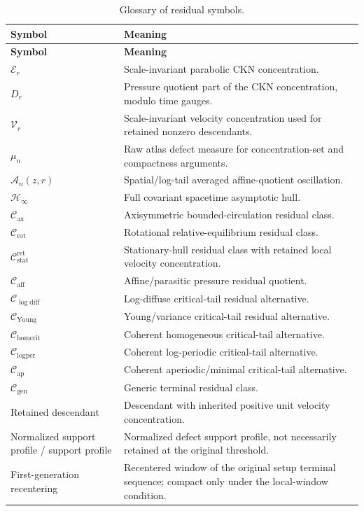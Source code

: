 \documentclass[11pt]{amsart}
\numberwithin{equation}{section}
\theoremstyle{plain}
\theoremstyle{definition}
\theoremstyle{remark}
\newcommand{\calE}{\mathcal E}
\newcommand{\Vel}{\mathcal V}
\newcommand{\calH}{\mathcal H}
\newcommand{\Cax}{\mathcal C_{\mathrm{ax}}}
\newcommand{\Crot}{\mathcal C_{\mathrm{rot}}}
\newcommand{\Cstat}{\mathcal C_{\mathrm{stat}}^{\mathrm{ret}}}
\newcommand{\Caff}{\mathcal C_{\mathrm{aff}}}
\newcommand{\Cgen}{\mathcal C_{\mathrm{gen}}}
\newcommand{\Chomcrit}{\mathcal C_{\mathrm{homcrit}}}
\newcommand{\Clogper}{\mathcal C_{\mathrm{logper}}}
\newcommand{\Capcrit}{\mathcal C_{\mathrm{ap}}}
\newcommand{\Cyoung}{\mathcal C_{\mathrm{Young}}}
\newcommand{\Clogdiff}{\mathcal C_{\log\mathrm{diff}}}
\begin{document}
\begin{longtable}{@{}L{0.28\textwidth}L{0.66\textwidth}@{}}
\caption{Glossary of residual symbols.}
\label{tab:paperIV-glossary}\\
\hline
\textbf{Symbol} & \textbf{Meaning}\\
\hline
\endfirsthead
\hline
\textbf{Symbol} & \textbf{Meaning}\\
\hline
\endhead
\hline
\endfoot
\(\calE_r\) & Scale-invariant parabolic CKN concentration.\\
\(D_r\) & Pressure quotient part of the CKN concentration, modulo time gauges.\\
\(\Vel_r\) & Scale-invariant velocity concentration used for retained
nonzero descendants.\\
\(\mu_n\) & Raw atlas defect measure for concentration-set and compactness
arguments.\\
\(\mathcal A_n(z,r)\) & Spatial/log-tail averaged affine-quotient oscillation.\\
\(\calH_\infty\) & Full covariant spacetime asymptotic hull.\\
\(\Cax\) & Axisymmetric bounded-circulation residual class.\\
\(\Crot\) & Rotational relative-equilibrium residual class.\\
\(\Cstat\) & Stationary-hull residual class with retained local velocity concentration.\\
\(\Caff\) & Affine/parasitic pressure residual quotient.\\
\(\Clogdiff\) & Log-diffuse critical-tail residual alternative.\\
\(\Cyoung\) & Young/variance critical-tail residual alternative.\\
\(\Chomcrit\) & Coherent homogeneous critical-tail alternative.\\
\(\Clogper\) & Coherent log-periodic critical-tail alternative.\\
\(\Capcrit\) & Coherent aperiodic/minimal critical-tail alternative.\\
\(\Cgen\) & Generic terminal residual class.\\
Retained descendant & Descendant with inherited positive unit velocity concentration.\\
Normalized support profile / support profile & Normalized defect
support profile, not necessarily retained at the original threshold.\\
First-generation recentering & Recentered window of the original setup terminal
sequence; compact only under the local-window condition.\\

\end{longtable}
\end{document}
